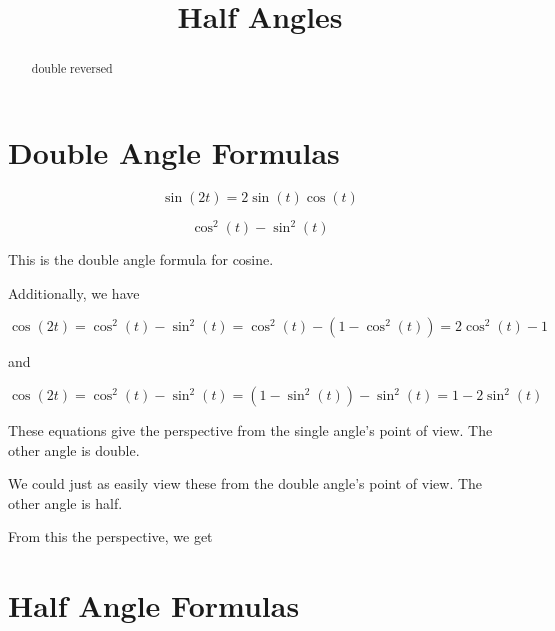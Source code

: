 \documentclass{ximera}
\title{Half Angles}
\begin{document}
\begin{abstract}
double reversed
\end{abstract}
\maketitle






\section*{Double Angle Formulas}




\[   \sin(2t) = 2 \sin(t)   \cos(t)      \]






\[      \cos^2(t) - \sin^2(t)      \]





This is the double angle formula for cosine. 

Additionally, we have 




\[   \cos(2t) =    \cos^2(t) - \sin^2(t)  =    \cos^2(t) - (1 - \cos^2(t)) =  2 \cos^2(t) - 1 \]


and

\[   \cos(2t) =    \cos^2(t) - \sin^2(t)  =    (1 - \sin^2(t)) - \sin^2(t)  = 1 - 2 \sin^2(t)     \]






These equations give the perspective from the single angle's point of view. The other angle is double.


We could just as easily view these from the double angle's point of view. The other angle is half.

From this the perspective, we get 





























\section*{Half Angle Formulas}
\end{document}

